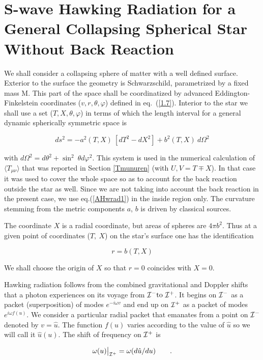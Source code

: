 \documentclass[12pt,oneside]{report}
\def\beq {\begin{equation}}
\def\feq {\end{equation}}
\begin{document}
\chapter{S-wave Hawking Radiation for a General Collapsing Spherical
Star Without Back Reaction
 }\label{sphradd}


We shall consider a collapsing sphere of matter with a well
defined surface. Exterior to the surface the geometry is
Schwarzschild, parametrized by a fixed mass M. This part of
the space shall be coordinatized by advanced Eddington-Finkelstein
 coordinates ($ v, r,\theta, \varphi $) defined in eq.~({\ref{1.7}}).
 Interior to the star we
shall use a set ($ T, X, \theta, \varphi $) in terms of which the length interval for
a general dynamic spherically symmetric space is

\beq  ds^2 = -a^2 (T, X)\  [dT^2-dX^2 ] + b^2 (T, X)\  d\Omega^2
\label{AHwrad1} \feq

\noindent with $  d \Omega^2 = d \theta^2 + \sin^2\ \theta d
\varphi^2 $. This system is used in the  numerical calculation
of $\langle T_{\mu \nu} \rangle$ that was reported in 
Section \ref{Tmunuren} (with $U, V = T \mp X$). In that case it was
used to cover the whole space so as to account for the back
reaction outside the star as well. Since we are not taking
into account the back reaction in the present case, we use
eq.(\ref{AHwrad1}) in the inside region only. The curvature stemming from
the metric components $a$, $b$ is driven by classical sources.


The coordinate $X$ is a radial coordinate, but areas of
spheres are $ 4 \pi b^2$. Thus at a given point of coordinates ($T,\ X$) on the
star's surface one has the identification

\beq r = b (T, X) \label{AHwrad2}\feq


\noindent We shall choose the origin of $X$ so that $r = 0$
coincides with $X = 0$.

Hawking radiation follows from the combined gravitational and
Doppler shifts that a photon experiences on its voyage from
${\cal I}^- \mbox{\rm to } {\cal I}^+$. It begins on ${\cal I}^-$ as a
packet (superposition) of modes $ e^{-i\omega v}$ and end up on $ {\cal I}^+$ as a
packet of modes $ e^{i \omega f(u)}$. We consider a particular radial packet
that emanates from a point on $ {\cal I} ^-$ denoted by $ v =
{\hat u} $. The function $f(u)$ varies according to the value of
$ \hat u$ so we will call it $ \hat u (u)$. The shift of
frequency on $ {\cal I} ^+$ is

\beq \omega (u)\big|_{{\cal I}^+} = \omega (d {\hat u} / d
u)\qquad . \label{AHwrad3}\feq
\end{document}
